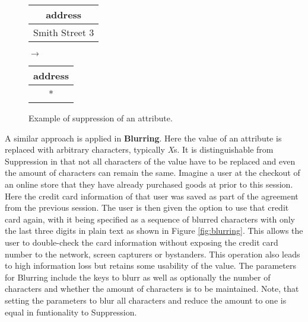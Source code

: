 \bigskip

\begin{figure}[ht]
    \begin{center}
    \footnotesize{
        \renewcommand{\arraystretch}{1.5}
        \begin{tabular}{|c|}
            \hline
            address \\
            \hline
            Smith Street 3 \\
            \hline
            \end{tabular}
            \quad $\longrightarrow$ \quad
            \begin{tabular}{|c|}
            \hline
            address \\
            \hline
            * \\
            \hline
        \end{tabular}
    }
    \end{center}
    \caption{Example of suppression of an attribute.\label{fig:suppression}}
\end{figure}

A similar approach is applied in \textbf{Blurring}. Here the value of an attribute is replaced with arbitrary characters, typically \textit{X}s. It is distinguishable from Suppression in that not all characters of the value have to be replaced and even the amount of characters can remain the same. Imagine a user at the checkout of an online store that they have already purchased goods at prior to this session. Here the credit card information of that user was saved as part of the agreement from the previous session. The user is then given the option to use that credit card again, with it being specified as a sequence of blurred characters with only the last three digits in plain text as shown in Figure \ref{fig:blurring}. This allows the user to double-check the card information without exposing the credit card number to the network, screen capturers or bystanders. This operation also leads to high information loss but retains some usability of the value. The parameters for Blurring include the keys to blurr as well as optionally the number of characters and whether the amount of characters is to be maintained. Note, that setting the parameters to blur all characters and reduce the amount to one is equal in funtionality to Suppression. 

\bigskip

